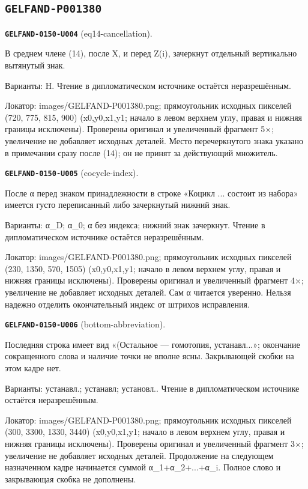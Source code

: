 \documentclass[11pt]{article}
\theoremstyle{definition}
\theoremstyle{remark}
\begin{document}
\subsection*{\texttt{GELFAND-P001380}}
\noindent\leavevmode{}\label{GELFAND-P001380:eq14-cancellation:note}\textbf{\texttt{GELFAND-0150-U004}} (eq14-cancellation).\par\nopagebreak[4]
В среднем члене (14), после X, и перед Z(i), зачеркнут отдельный вертикально вытянутый знак.\par
Варианты: H. Чтение в дипломатическом источнике остаётся неразрешённым.\par
Локатор: images/GELFAND-P001380.png; прямоугольник исходных пикселей (720, 775, 815, 900) (x0,y0,x1,y1; начало в левом верхнем углу, правая и нижняя границы исключены). Проверены оригинал и увеличенный фрагмент 5×; увеличение не добавляет исходных деталей. Место перечеркнутого знака указано в примечании сразу после (14); он не принят за действующий множитель.\par\medskip
\noindent\leavevmode{}\label{GELFAND-P001380:cocycle-index:note}\textbf{\texttt{GELFAND-0150-U005}} (cocycle-index).\par\nopagebreak[4]
После α перед знаком принадлежности в строке «Коцикл ... состоит из набора» имеется густо переписанный либо зачеркнутый нижний знак.\par
Варианты: α\_D; α\_0; α без индекса; нижний знак зачеркнут. Чтение в дипломатическом источнике остаётся неразрешённым.\par
Локатор: images/GELFAND-P001380.png; прямоугольник исходных пикселей (230, 1350, 570, 1505) (x0,y0,x1,y1; начало в левом верхнем углу, правая и нижняя границы исключены). Проверены оригинал и увеличенный фрагмент 4×; увеличение не добавляет исходных деталей. Сам α читается уверенно. Нельзя надежно отделить окончательный индекс от штрихов исправления.\par\medskip
\noindent\leavevmode{}\label{GELFAND-P001380:bottom-abbreviation:note}\textbf{\texttt{GELFAND-0150-U006}} (bottom-abbreviation).\par\nopagebreak[4]
Последняя строка имеет вид «(Остальное — гомотопия, устанавл...»; окончание сокращенного слова и наличие точки не вполне ясны. Закрывающей скобки на этом кадре нет.\par
Варианты: устанавл.; устанавл; установл.. Чтение в дипломатическом источнике остаётся неразрешённым.\par
Локатор: images/GELFAND-P001380.png; прямоугольник исходных пикселей (300, 3300, 1330, 3440) (x0,y0,x1,y1; начало в левом верхнем углу, правая и нижняя границы исключены). Проверены оригинал и увеличенный фрагмент 3×; увеличение не добавляет исходных деталей. Продолжение на следующем назначенном кадре начинается суммой α\_1+α\_2+...+α\_i. Полное слово и закрывающая скобка не дополнены.\par\medskip
\end{document}
